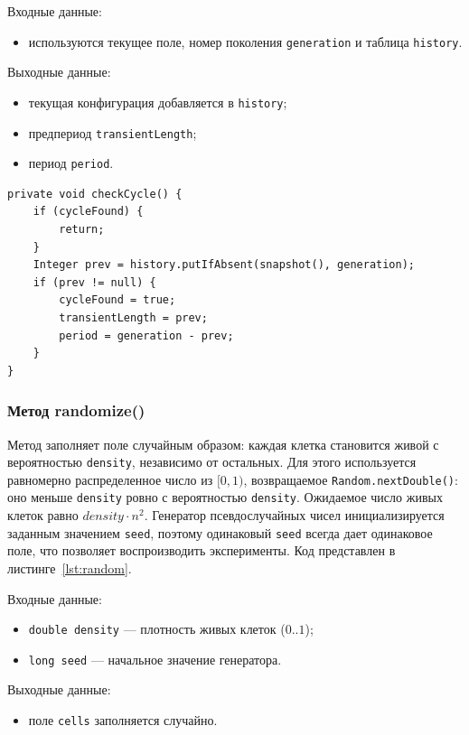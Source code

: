 Входные данные:
\begin{itemize}
	\item используются текущее поле, номер поколения \texttt{generation} и таблица \texttt{history}.
\end{itemize}

Выходные данные:
\begin{itemize}
	\item текущая конфигурация добавляется в \texttt{history};
	\item предпериод \texttt{transientLength};
	\item период \texttt{period}.
\end{itemize}

\begin{lstlisting}[caption={Метод checkCycle()}, label={lst:cycle}]
private void checkCycle() {
	if (cycleFound) {
		return;
	}
	Integer prev = history.putIfAbsent(snapshot(), generation);
	if (prev != null) {
		cycleFound = true;
		transientLength = prev;
		period = generation - prev;
	}
}
\end{lstlisting}

\subsubsection*{Метод randomize()}

Метод заполняет поле случайным образом: каждая клетка становится живой с вероятностью \texttt{density}, независимо от остальных. Для этого используется равномерно распределенное число из $[0, 1)$, возвращаемое \texttt{Random.nextDouble()}: оно меньше \texttt{density} ровно с вероятностью \texttt{density}. Ожидаемое число живых клеток равно $density \cdot n^2$. Генератор псевдослучайных чисел инициализируется заданным значением \texttt{seed}, поэтому одинаковый \texttt{seed} всегда дает одинаковое поле, что позволяет воспроизводить эксперименты. Код представлен в листинге~\ref{lst:random}.

Входные данные:
\begin{itemize}
	\item \texttt{double density} --- плотность живых клеток ($0..1$);
	\item \texttt{long seed} --- начальное значение генератора.
\end{itemize}

Выходные данные:
\begin{itemize}
	\item поле \texttt{cells} заполняется случайно.
\end{itemize}

